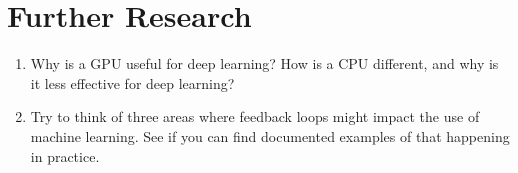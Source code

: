 \documentclass[12pt,a4paper]{article}
\begin{document}
\section*{Further Research}

\begin{enumerate}

\item Why is a GPU useful for deep learning? How is a CPU different, and why is it less effective for deep learning? \\

\item Try to think of three areas where feedback loops might impact the use of machine learning. See if you can find documented examples of that happening in practice.
\end{enumerate}
\end{document}
